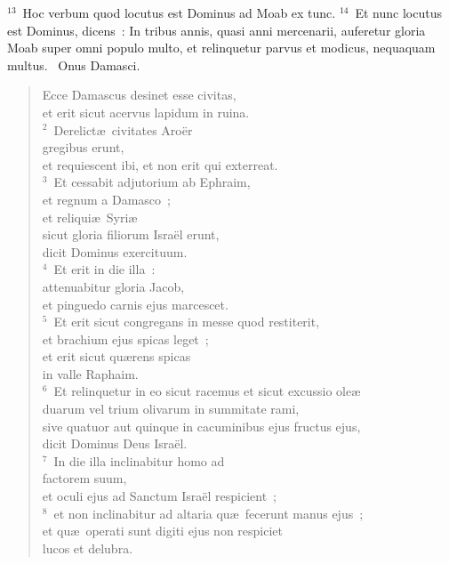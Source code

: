 ${}^{13}$~Hoc verbum quod locutus est Dominus ad Moab ex tunc.
${}^{14}$~Et nunc locutus est Dominus, dicens~: In tribus annis, quasi anni mercenarii, auferetur gloria Moab super omni populo multo, et relinquetur parvus et modicus, nequaquam multus.
~\lettrine[lines=10,image=true,loversize=0.05,lraise=-0.03]{O}{}nus Damasci. \begin{flushleft}\begin{verse}\vspace{6pt}Ecce Damascus desinet esse civitas,\\ et erit sicut acervus lapidum in ruina.\\
${}^{2}$~Derelict\ae\ civitates Aro\"er\\ gregibus erunt,\\ et requiescent ibi, et non erit qui exterreat.\\
${}^{3}$~Et cessabit adjutorium ab Ephraim,\\ et regnum a Damasco~;\\ et reliqui\ae\ Syri\ae \\ sicut gloria filiorum Isra\"el erunt,\\ dicit Dominus exercituum.\\
${}^{4}$~Et erit in die illa~:\\ attenuabitur gloria Jacob,\\ et pinguedo carnis ejus marcescet.\\
${}^{5}$~Et erit sicut congregans in messe quod restiterit,\\ et brachium ejus spicas leget~;\\ et erit sicut qu\ae rens spicas\\ in valle Raphaim.\\
${}^{6}$~Et relinquetur in eo sicut racemus et sicut excussio ole\ae \\ duarum vel trium olivarum in summitate rami,\\ sive quatuor aut quinque in cacuminibus ejus fructus ejus,\\ dicit Dominus Deus Isra\"el.\\
${}^{7}$~In die illa inclinabitur homo ad\\ factorem suum,\\ et oculi ejus ad Sanctum Isra\"el respicient~;\\
${}^{8}$~et non inclinabitur ad altaria qu\ae\ fecerunt manus ejus~;\\ et qu\ae\ operati sunt digiti ejus non respiciet\\ lucos et delubra.\\

\end{verse}
\end{flushleft}
